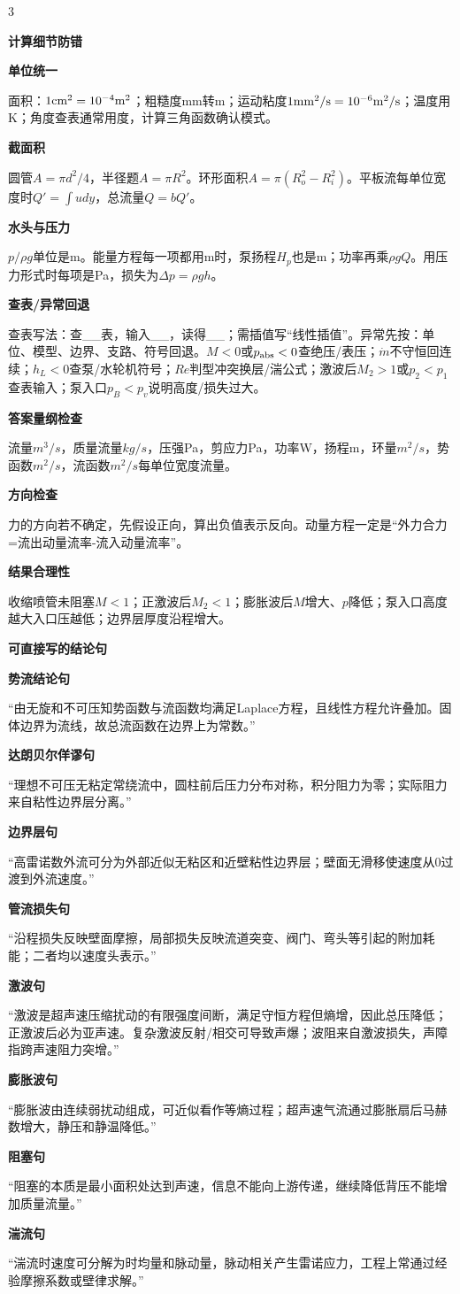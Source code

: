 \documentclass[a4paper]{article}
\newcommand{\qt}[1]{\vspace{0.25pt}\colorbox{Q}{\parbox{\dimexpr\linewidth-2\fboxsep}{\color{white}\bfseries #1}}\par}
\newcommand{\sect}[1]{\qt{#1}}
\begin{document}
\begin{multicols}{3}
{\sect{计算细节防错}
\sect{单位统一}
面积：$1{\rm cm^2}=10^{-4}{\rm m^2}$；粗糙度mm转m；运动粘度$1{\rm mm^2/s}=10^{-6}{\rm m^2/s}$；温度用K；角度查表通常用度，计算三角函数确认模式。
\sect{截面积}
圆管$A=\pi d^2/4$，半径题$A=\pi R^2$。环形面积$A=\pi(R_o^2-R_i^2)$。平板流每单位宽度时$Q'=\int udy$，总流量$Q=bQ'$。
\sect{水头与压力}
$p/\rho g$单位是m。能量方程每一项都用m时，泵扬程$H_p$也是m；功率再乘$\rho gQ$。用压力形式时每项是Pa，损失为$\Delta p=\rho gh$。
\sect{查表/异常回退}
查表写法：查\_\_表，输入\_\_，读得\_\_；需插值写“线性插值”。异常先按：单位、模型、边界、支路、符号回退。$M<0$或$p_{\rm abs}<0$查绝压/表压；$\dot m$不守恒回连续；$h_L<0$查泵/水轮机符号；$Re$判型冲突换层/湍公式；激波后$M_2>1$或$p_2<p_1$查表输入；泵入口$p_B<p_v$说明高度/损失过大。
\sect{答案量纲检查}
流量$m^3/s$，质量流量$kg/s$，压强Pa，剪应力Pa，功率W，扬程m，环量$m^2/s$，势函数$m^2/s$，流函数$m^2/s$每单位宽度流量。
\sect{方向检查}
力的方向若不确定，先假设正向，算出负值表示反向。动量方程一定是“外力合力=流出动量流率-流入动量流率”。
\sect{结果合理性}
收缩喷管未阻塞$M<1$；正激波后$M_2<1$；膨胀波后$M$增大、$p$降低；泵入口高度越大入口压越低；边界层厚度沿程增大。

\sect{可直接写的结论句}
\sect{势流结论句}
“由无旋和不可压知势函数与流函数均满足Laplace方程，且线性方程允许叠加。固体边界为流线，故总流函数在边界上为常数。”
\sect{达朗贝尔佯谬句}
“理想不可压无粘定常绕流中，圆柱前后压力分布对称，积分阻力为零；实际阻力来自粘性边界层分离。”
\sect{边界层句}
“高雷诺数外流可分为外部近似无粘区和近壁粘性边界层；壁面无滑移使速度从0过渡到外流速度。”
\sect{管流损失句}
“沿程损失反映壁面摩擦，局部损失反映流道突变、阀门、弯头等引起的附加耗能；二者均以速度头表示。”
\sect{激波句}
“激波是超声速压缩扰动的有限强度间断，满足守恒方程但熵增，因此总压降低；正激波后必为亚声速。复杂激波反射/相交可导致声爆；波阻来自激波损失，声障指跨声速阻力突增。”
\sect{膨胀波句}
“膨胀波由连续弱扰动组成，可近似看作等熵过程；超声速气流通过膨胀扇后马赫数增大，静压和静温降低。”
\sect{阻塞句}
“阻塞的本质是最小面积处达到声速，信息不能向上游传递，继续降低背压不能增加质量流量。”
\sect{湍流句}
“湍流时速度可分解为时均量和脉动量，脉动相关产生雷诺应力，工程上常通过经验摩擦系数或壁律求解。”

}
\end{multicols}
\end{document}
